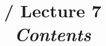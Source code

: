 \renewcommand{\prevlecture}{6 }
\renewcommand{\thislecture}{7 }
\renewcommand{\nextlecture}{8 }

%
%

\title[\modulename / Lecture \thislecture]
{
  \modulename / Lecture \thislecture \\
  {\it Contents}\\
}



\begin{frame}[plain]
  \titlepage
\end{frame}


